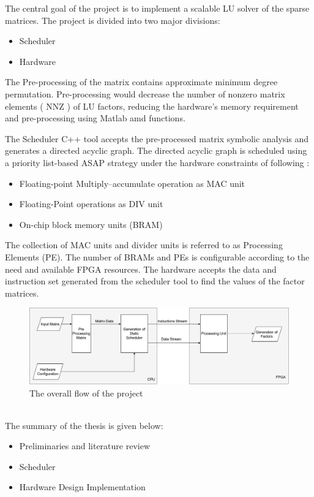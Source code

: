 The central goal of the project is to implement a scalable LU solver of the sparse matrices. The project is divided into two major divisions:
\begin{itemize}
    \item Scheduler
    \item Hardware
\end{itemize} 

The Pre-processing of the matrix contains approximate minimum degree permutation. Pre-processing would decrease the number of nonzero matrix elements ( NNZ ) of LU factors, reducing the hardware's memory requirement and pre-processing using Matlab amd functions.

The Scheduler C++ tool accepts the pre-processed matrix symbolic analysis and generates a directed acyclic graph. The directed acyclic graph is scheduled using a priority list-based ASAP strategy under the hardware constraints of following :
\begin{itemize}
    \item Floating-point Multiply–accumulate operation as MAC unit
    \item Floating-Point operations as DIV unit
    \item On-chip block memory units (BRAM)
\end{itemize} 

The collection of MAC units and divider units is referred to as Processing Elements (PE). The number of BRAMs and PEs is configurable according to the need and available FPGA resources. The hardware accepts the data and instruction set generated from the scheduler tool to find the values of the factor matrices.
\begin{figure}[h]
    \centering
    \includegraphics[width = 0.9\linewidth]{./Introduction/Introduction_flow_of_project_drawio.png}
    \caption{The overall flow of the project}
\end{figure}
\\
The summary of the thesis is given below:
\begin{itemize}
    \item Preliminaries and literature review
    \item Scheduler
    \item Hardware Design Implementation
\end{itemize} 



